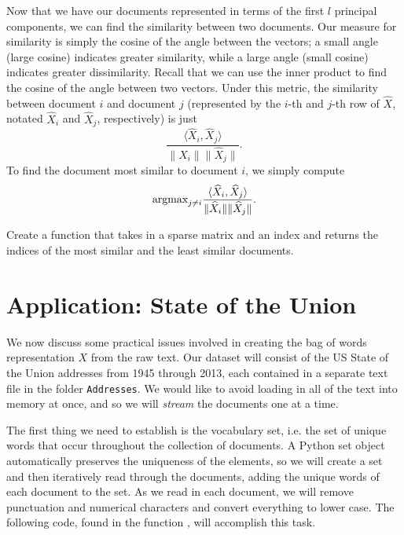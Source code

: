 Now that we have our documents represented in terms of the first $l$ principal components, we can find the similarity between two documents.
Our measure for similarity is simply the cosine of the angle between the vectors; a small angle (large cosine) indicates greater similarity, while a large angle (small cosine) indicates greater dissimilarity.
Recall that we can use the inner product to find the cosine of the angle between two vectors.
Under this metric, the similarity between document $i$ and document $j$ (represented by the $i$-th and $j$-th row of $\widehat{X}$, notated $\widehat{X}_i$ and $\widehat{X}_j$, respectively) is just
\[
\frac{\langle \widehat{X}_i, \widehat{X}_j\rangle}{\|\widehat{X}_i\|\|\widehat{X}_j\|}.
\]
To find the document most similar to document $i$, we simply compute
\[
\mbox{argmax}_{j\neq i} \frac{\langle \widehat{X}_i, \widehat{X}_j\rangle}{\|\widehat{X}_i\|\|\widehat{X}_j\|}.
\]

\begin{problem} %
Create a function  that takes in a sparse matrix  and an index  and returns the indices of the most similar and the least similar documents.
\end{problem}

\section*{Application: State of the Union} 
We now discuss some practical issues involved in creating the bag of words representation $X$ from the raw text.
Our dataset will consist of the US State of the Union addresses from 1945 through 2013, each contained in a separate text file in the folder {\tt Addresses}.
We would like to avoid loading in all of the text into memory at once, and so we will \emph{stream} the documents one at a time.

The first thing we need to establish is the vocabulary set, i.e. the set of unique words that occur throughout the collection of documents.
A Python set object automatically preserves the uniqueness of the elements, so we will create a set and then iteratively read through the documents, adding the unique words of each document to the set.
As we read in each document, we will remove punctuation and numerical characters and convert everything to lower case.
The following code, found in the function , will accomplish this task. 

